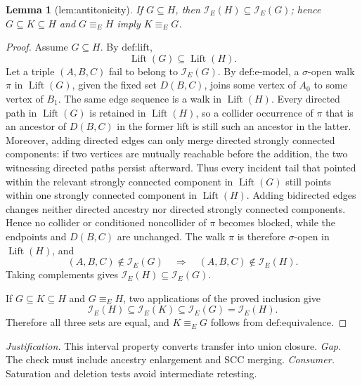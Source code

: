 \documentclass{article}
\newtheorem{lemma}{Lemma}
\begin{document}
\begin{lemma}[lem:antitonicity]\label{lem:antitonicity}
If \(G\subseteq H\), then \(\mathcal I_E(H)\subseteq\mathcal I_E(G)\); hence \(G\subseteq K\subseteq H\) and \(G\equiv_E H\) imply \(K\equiv_E G\).
\end{lemma}
\begin{proof}
Assume \(G\subseteq H\).  By \(\text{def:lift}\),
\[
\operatorname{Lift}(G)\subseteq\operatorname{Lift}(H).
\]
Let a triple \((A,B,C)\) fail to belong to \(\mathcal I_E(G)\).  By \(\text{def:e-model}\), a \(\sigma\)-open walk \(\pi\) in \(\operatorname{Lift}(G)\), given the fixed set \(D(B,C)\), joins some vertex of \(A_0\) to some vertex of \(B_1\).  The same edge sequence is a walk in \(\operatorname{Lift}(H)\).  Every directed path in \(\operatorname{Lift}(G)\) is retained in \(\operatorname{Lift}(H)\), so a collider occurrence of \(\pi\) that is an ancestor of \(D(B,C)\) in the former lift is still such an ancestor in the latter.  Moreover, adding directed edges can only merge directed strongly connected components: if two vertices are mutually reachable before the addition, the two witnessing directed paths persist afterward.  Thus every incident tail that pointed within the relevant strongly connected component in \(\operatorname{Lift}(G)\) still points within one strongly connected component in \(\operatorname{Lift}(H)\).  Adding bidirected edges changes neither directed ancestry nor directed strongly connected components.  Hence no collider or conditioned noncollider of \(\pi\) becomes blocked, while the endpoints and \(D(B,C)\) are unchanged.  The walk \(\pi\) is therefore \(\sigma\)-open in \(\operatorname{Lift}(H)\), and
\[
(A,B,C)\notin\mathcal I_E(G)
\quad\Longrightarrow\quad
(A,B,C)\notin\mathcal I_E(H).
\]
Taking complements gives \(\mathcal I_E(H)\subseteq\mathcal I_E(G)\).

If \(G\subseteq K\subseteq H\) and \(G\equiv_E H\), two applications of the proved inclusion give
\[
\mathcal I_E(H)\subseteq\mathcal I_E(K)\subseteq\mathcal I_E(G)
=\mathcal I_E(H).
\]
Therefore all three sets are equal, and \(K\equiv_E G\) follows from \(\text{def:equivalence}\).
\end{proof}
\par\smallskip\noindent \textit{Justification.} This interval property converts transfer into union closure. \textit{Gap.} The check must include ancestry enlargement and SCC merging. \textit{Consumer.} Saturation and deletion tests avoid intermediate retesting.
\end{document}
